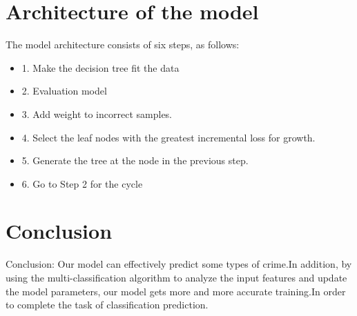 \documentclass{amsart}
\begin{document}
\newpage

\section{Architecture of the model}

The model architecture consists of six steps, as follows:\\

	\begin{itemize}
	\item 1. Make the decision tree fit the data\\
	\item 2. Evaluation model\\
	\item 3. Add weight to incorrect samples.\\
	\item 4. Select the leaf nodes with the greatest incremental loss for growth.\\
	\item 5. Generate the tree at the node in the previous step.\\
	\item 6. Go to Step 2 for the cycle\\
\end{itemize}

\newpage
\section{Conclusion}

	Conclusion: Our model can effectively predict some types of crime.In addition, by using the multi-classification algorithm to analyze the input features and update the model parameters, our model gets more and more accurate training.In order to complete the task of classification prediction.\\
	\\


%
%

\end{document}
